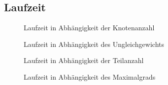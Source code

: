 \subsection{Laufzeit}

\begin{figure}
    \centering
    
    \caption{Laufzeit in Abhängigkeit der Knotenanzahl}
\end{figure}

\begin{figure}
    \centering
    
    \caption{Laufzeit in Abhängigkeit des Ungleichgewichts}
\end{figure}

\begin{figure}
    \centering
    
    \caption{Laufzeit in Abhängigkeit der Teilanzahl}
\end{figure}

\begin{figure}
    \centering
    
    \caption{Laufzeit in Abhängigkeit des Maximalgrads}
\end{figure}


